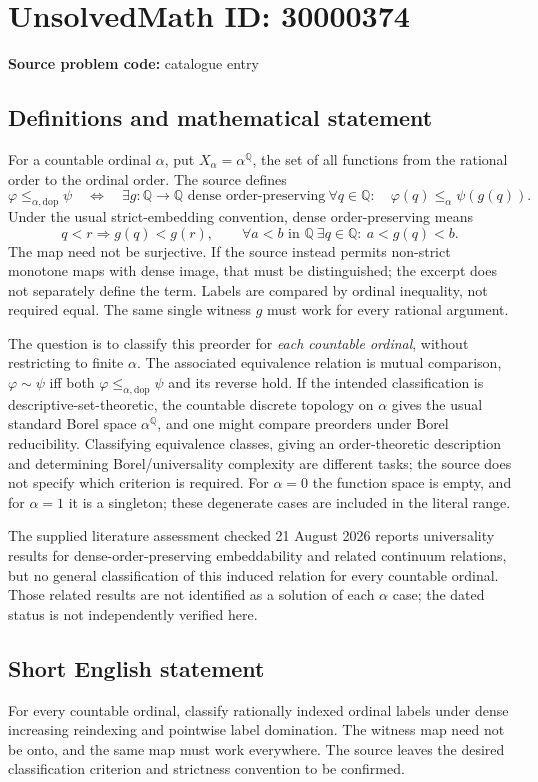 \documentclass[11pt]{article}
\newcommand{\Q}{\mathbb{Q}}
\begin{document}
\section*{UnsolvedMath ID: 30000374}
\textbf{Source problem code:} catalogue entry
\subsection{Definitions and mathematical statement}
For a countable ordinal $\alpha$, put $X_\alpha=\alpha^{\Q}$, the set of all functions from the rational order to the ordinal order. The source defines
\[
 \varphi\leq_{\alpha,\mathrm{dop}}\psi
 \quad\Longleftrightarrow\quad
 \exists g:\Q\to\Q\text{ dense order-preserving}\ 
 \forall q\in\Q:\quad\varphi(q)\leq_\alpha\psi(g(q)).
\]
Under the usual strict-embedding convention, dense order-preserving means
\[
 q<r\Longrightarrow g(q)<g(r),\qquad
 \forall a<b\text{ in }\Q\ \exists q\in\Q:\ a<g(q)<b.
\]
The map need not be surjective. If the source instead permits non-strict monotone maps with dense image, that must be distinguished; the excerpt does not separately define the term. Labels are compared by ordinal inequality, not required equal. The same single witness $g$ must work for every rational argument.

The question is to classify this preorder for \emph{each countable ordinal}, without restricting to finite $\alpha$. The associated equivalence relation is mutual comparison, $\varphi\sim\psi$ iff both $\varphi\leq_{\alpha,\mathrm{dop}}\psi$ and its reverse hold. If the intended classification is descriptive-set-theoretic, the countable discrete topology on $\alpha$ gives the usual standard Borel space $\alpha^{\Q}$, and one might compare preorders under Borel reducibility. Classifying equivalence classes, giving an order-theoretic description and determining Borel/universality complexity are different tasks; the source does not specify which criterion is required. For $\alpha=0$ the function space is empty, and for $\alpha=1$ it is a singleton; these degenerate cases are included in the literal range.

The supplied literature assessment checked 21 August 2026 reports universality results for dense-order-preserving embeddability and related continuum relations, but no general classification of this induced relation for every countable ordinal. Those related results are not identified as a solution of each $\alpha$ case; the dated status is not independently verified here.
\subsection{Short English statement}
For every countable ordinal, classify rationally indexed ordinal labels under dense increasing reindexing and pointwise label domination. The witness map need not be onto, and the same map must work everywhere. The source leaves the desired classification criterion and strictness convention to be confirmed.
\end{document}
